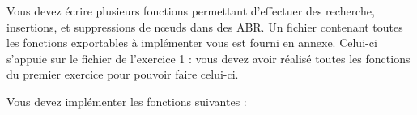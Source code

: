 

\vspace*{0.7cm}

\noindent {}

\bigskip

%

\noindent Vous devez écrire plusieurs fonctions permettant d'effectuer des recherche, insertions, et suppressions de nœuds dans des ABR.
Un fichier  contenant toutes les fonctions exportables à implémenter vous est fourni en annexe.
Celui-ci s'appuie sur le fichier  de l'exercice 1 : vous devez avoir réalisé toutes les fonctions du premier exercice pour pouvoir faire celui-ci.


\bigskip




\bigskip

\noindent Vous devez implémenter les fonctions suivantes :

\bigskip

